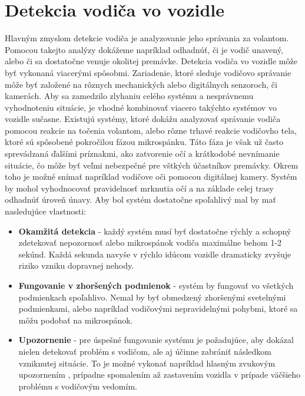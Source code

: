 \documentclass[slovak,master,dept460,male,cpp,cpdeclaration]{diploma}
\begin{document}
\section{Detekcia vodiča vo vozidle}
\label{sec:Pose detection}
Hlavným zmyslom detekcie vodiča je analyzovanie jeho správania za volantom.  Pomocou takejto analýzy dokážeme napríklad odhadnúť, či je vodič unavený, alebo či sa dostatočne venuje okolitej premávke. Detekcia vodiča vo vozidle môže byť vykonaná viacerými spôsobmi. Zariadenie, ktoré sleduje vodičovo správanie môže byť založené na rôznych mechanických alebo digitálnych senzoroch, či kamerách. Aby sa zamedzilo zlyhaniu celého systému a nesprávnemu vyhodnoteniu situácie, je vhodné kombinovať viacero takýchto systémov vo vozidle sučasne. Existujú systémy, ktoré dokážu analyzovať správanie vodiča pomocou reakcie na točenia volantom, alebo rôzne trhavé reakcie vodičovho tela, ktoré sú spôsobené pokročilou fázou mikrospánku. Táto fáza je však už často sprevádzaná ďalšími príznakmi, ako zatvorenie očí a  krátkodobé nevnímanie situácie, čo môže byť veľmi nebezpečné pre vštkých účastníkov premávky.  Okrem toho je možné snímať napríklad  vodičove oči pomocou digitálnej kamery. Systém by mohol vyhodnocovať  pravidelnosť mrknutia očí a na základe celej trasy odhadnúť úroveň únavy. Aby bol systém dostatočne spoľahlivý mal by mať nasledujúce vlastnosti:
\begin{itemize}
\item \textbf{Okamžitá detekcia} - každý systém musí byť dostatočne rýchly a schopný zdetekovať nepozornosť alebo mikrospánok vodiča maximálne behom 1-2 sekúnd. Každá sekunda navyše v rýchlo idúcom vozidle dramaticky zvyšuje riziko vzniku dopravnej nehody.
\item \textbf{Fungovanie v zhoršených podmienok} - systém by  fungovať vo všetkých podmienkach  spoľahlivo. Nemal by byť obmedzený zhoršenými svetelnými podmienkami, alebo napríklad vodičovými nepravidelnými pohybmi, ktoré sa môžu podobať na mikrospánok.
\item \textbf{Upozornenie} - pre úspešné fungovanie systému je požadujúce, aby dokázal nielen detekovať problém s vodičom, ale aj účinne zabrániť následkom vzniknutej situácie. To je možné vykonať napríklad hlasným zvukovým upozornením , prípadne spomalením až zastavením vozidla v prípade väčšieho problému s vodičovým vedomím. 
\end{itemize}
\end{document}
